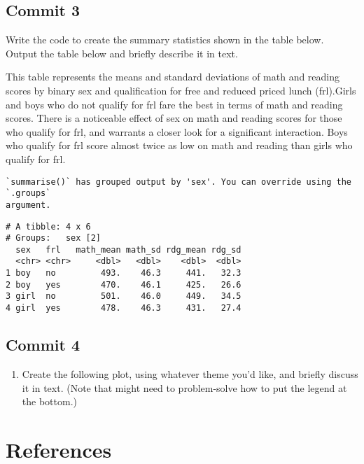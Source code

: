 \documentclass[
  letterpaper,
  DIV=11,
  numbers=noendperiod]{scrartcl}
\providecommand{\tightlist}{%
  \setlength{\itemsep}{0pt}\setlength{\parskip}{0pt}}\usepackage{longtable,booktabs,array}
\begin{document}
\hypertarget{commit-3}{%
\subsection{Commit 3}\label{commit-3}}

Write the code to create the summary statistics shown in the table
below. Output the table below and briefly describe it in text.

This table represents the means and standard deviations of math and
reading scores by binary sex and qualification for free and reduced
priced lunch (frl).Girls and boys who do not qualify for frl fare the
best in terms of math and reading scores. There is a noticeable effect
of sex on math and reading scores for those who qualify for frl, and
warrants a closer look for a significant interaction. Boys who qualify
for frl score almost twice as low on math and reading than girls who
qualify for frl.

\begin{verbatim}
`summarise()` has grouped output by 'sex'. You can override using the `.groups`
argument.
\end{verbatim}

\begin{verbatim}
# A tibble: 4 x 6
# Groups:   sex [2]
  sex   frl   math_mean math_sd rdg_mean rdg_sd
  <chr> <chr>     <dbl>   <dbl>    <dbl>  <dbl>
1 boy   no         493.    46.3     441.   32.3
2 boy   yes        470.    46.1     425.   26.6
3 girl  no         501.    46.0     449.   34.5
4 girl  yes        478.    46.3     431.   27.4
\end{verbatim}

\hypertarget{commit-4}{%
\subsection{Commit 4}\label{commit-4}}

\begin{enumerate}
\def\labelenumi{\arabic{enumi}.}
\tightlist
\item
  Create the following plot, using whatever theme you'd like, and
  briefly discuss it in text. (Note that might need to problem-solve how
  to put the legend at the bottom.)
\end{enumerate}

\newpage

\hypertarget{references}{%
\section*{References}\label{references}}
\end{document}
